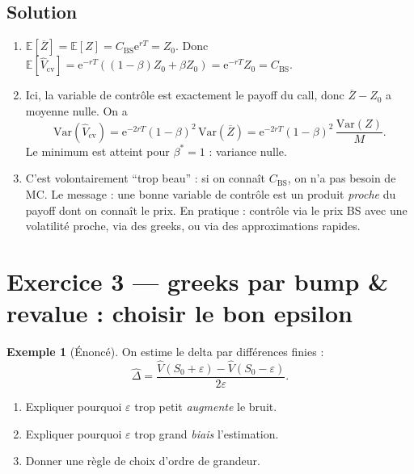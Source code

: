 \documentclass[11pt,a4paper]{report}
\newcommand{\ee}{\mathrm{e}}
\newcommand{\E}{\mathbb{E}}
\newcommand{\Var}{\mathrm{Var}}
\newcommand{\1}{\mathbbm{1}}
\newcommand{\BS}{\mathrm{BS}}
\theoremstyle{definition}
\newtheorem{example}{Exemple}[chapter]
\theoremstyle{plain}
\theoremstyle{remark}
\begin{document}
\subsection*{Solution}
\begin{enumerate}[label=\alph*)]
  \item $\E[\overline{Z}]=\E[Z]=C_{\BS}\ee^{rT}=Z_0$.
  Donc $\E[\widehat{V}_{\mathrm{cv}}]=\ee^{-rT}((1-\beta)Z_0+\beta Z_0)=\ee^{-rT}Z_0=C_{\BS}$.
  \item Ici, la variable de contrôle est exactement le payoff du call, donc $\overline{Z}-Z_0$ a moyenne nulle.
  On a
  \[\Var(\widehat{V}_{\mathrm{cv}})=\ee^{-2rT}(1-\beta)^2\,\Var(\overline{Z})
  =\ee^{-2rT}(1-\beta)^2\,\frac{\Var(Z)}{M}.
  \]
  Le minimum est atteint pour $\beta^*=1$ : variance nulle.
  \item C'est volontairement ``trop beau'' : si on connaît $C_{\BS}$, on n'a pas besoin de MC.
  Le message : une bonne variable de contrôle est un produit \emph{proche} du payoff dont on connaît le prix.
  En pratique : contrôle via le prix BS avec une volatilité proche, via des greeks, ou via des approximations rapides.
\end{enumerate}

\section{Exercice 3 --- greeks par bump \& revalue : choisir le bon epsilon}
\begin{example}[Énoncé]
On estime le delta par différences finies :
\[\widehat{\Delta} = \frac{\widehat{V}(S_0+\varepsilon)-\widehat{V}(S_0-\varepsilon)}{2\varepsilon}.
\]
\begin{enumerate}[label=\alph*)]
  \item Expliquer pourquoi $\varepsilon$ trop petit \emph{augmente} le bruit.
  \item Expliquer pourquoi $\varepsilon$ trop grand \emph{biais} l'estimation.
  \item Donner une règle de choix d'ordre de grandeur.
\end{enumerate}
\end{example}
\end{document}
